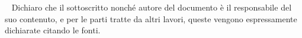 \documentclass[11pt]{article}
\begin{document}

\newpage
\ 
\newpage
\vfill
Dichiaro che il sottoscritto nonché autore del
documento è il responsabile del suo contenuto, e per le parti tratte da altri lavori, queste vengono espressamente dichiarate
citando le fonti.
\newpage
\
\newpage

\begin{abstract}
    \lipsum[1]
\end{abstract}
\newpage
\
\newpage

\tableofcontents
\listoftables
\listoffigures
\newpage

\pagestyle{fancy}



\printbibliography

\appendix 

\end{document}
